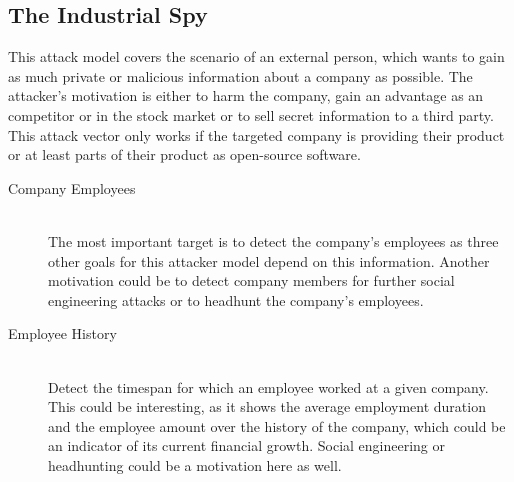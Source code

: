 \subsection{The Industrial Spy}\label{industrial-spy}
This attack model covers the scenario of an external person, which wants to gain as much private or malicious information about a company as possible.
The attacker's motivation is either to harm the company, gain an advantage as an competitor or in the stock market or to sell secret information to a third party.
This attack vector only works if the targeted company is providing their product or at least parts of their product as open-source software.

\begin{description}
    \item[Company Employees] \hfill \\
        The most important target is to detect the company's employees as three other goals for this attacker model depend on this information.
        Another motivation could be to detect company members for further social engineering attacks or to headhunt the company's employees.

    \item[Employee History] \hfill \\
        Detect the timespan for which an employee worked at a given company.
        This could be interesting, as it shows the average employment duration and the employee amount over the history of the company, which could be an indicator of its current financial growth.
        Social engineering or headhunting could be a motivation here as well.


\end{description}
